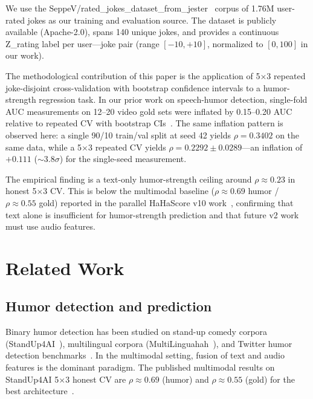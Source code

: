 \documentclass[11pt, letterpaper]{article}
\begin{document}
We use the SeppeV/rated\_jokes\_dataset\_from\_jester~\cite{seppev-jester} corpus of 1.76M user-rated jokes as our training and evaluation source. The dataset is publicly available (Apache-2.0), spans 140 unique jokes, and provides a continuous Z\_rating label per user---joke pair (range $[-10, +10]$, normalized to $[0, 100]$ in our work).

The methodological contribution of this paper is the application of 5$\times$3 repeated joke-disjoint cross-validation with bootstrap confidence intervals to a humor-strength regression task. In our prior work on speech-humor detection, single-fold AUC measurements on 12--20 video gold sets were inflated by 0.15--0.20 AUC relative to repeated CV with bootstrap CIs~\cite{hahascore-methodology}. The same inflation pattern is observed here: a single 90/10 train/val split at seed 42 yields $\rho = 0.3402$ on the same data, while a 5$\times$3 repeated CV yields $\rho = 0.2292 \pm 0.0289$---an inflation of $+0.111$ ($\sim 3.8\sigma$) for the single-seed measurement.

The empirical finding is a text-only humor-strength ceiling around $\rho \approx 0.23$ in honest 5$\times$3 CV. This is below the multimodal baseline ($\rho \approx 0.69$ humor / $\rho \approx 0.55$ gold) reported in the parallel HaHaScore v10 work~\cite{hahascore-methodology}, confirming that text alone is insufficient for humor-strength prediction and that future v2 work must use audio features.

\section{Related Work}

\subsection{Humor detection and prediction}

Binary humor detection has been studied on stand-up comedy corpora (StandUp4AI~\cite{standup4ai}), multilingual corpora (MultiLinguahah~\cite{multilinguahah}), and Twitter humor detection benchmarks~\cite{yang-etal-2015-humor, CNNhumor}. In the multimodal setting, fusion of text and audio features is the dominant paradigm. The published multimodal results on StandUp4AI 5$\times$3 honest CV are $\rho \approx 0.69$ (humor) and $\rho \approx 0.55$ (gold) for the best architecture~\cite{hahascore-methodology}.
\end{document}
